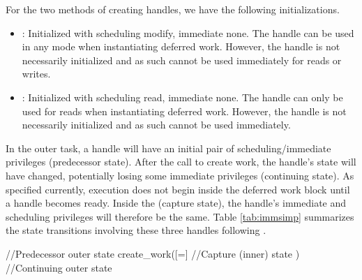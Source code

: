 For the two methods of creating handles, we have the following initializations.
\begin{itemize}
\item {}: Initialized with scheduling modify, immediate none. 
The handle can be used in any mode when instantiating deferred work.
However, the handle is not necessarily initialized and as such cannot be used immediately for reads or writes.
%
\item {}: Initialized with scheduling read, immediate none.
The handle can only be used for reads when instantiating deferred work.
However, the handle is not necessarily initialized and as such cannot be used immediately.
\end{itemize}


In the outer task, a handle will have an initial pair of scheduling/immediate privileges (predecessor state).
After the call to create work, the handle's state will have changed, potentially losing some immediate privileges (continuing state).
As specified currently, execution does not begin inside the deferred work block until a handle becomes ready.
Inside the \cwork (capture state), the handle's immediate and scheduling privileges will therefore be the same.
Table \ref{tab:immsimp} summarizes the state transitions involving these three handles following \cwork.
\begin{CppCode}
//Predecessor outer state
create_work([=]{
  //Capture (inner) state
})
//Continuing outer state
\end{CppCode}

